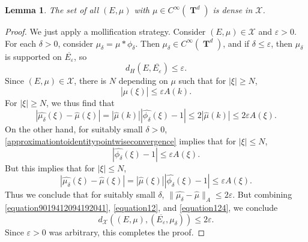 \documentclass[12pt,reqno]{article}
\DeclareMathOperator{\TT}{\mathbf{T}}
\newtheorem{lemma}[theorem]{Lemma}
\begin{document}
\begin{lemma}
    The set of all $(E,\mu)$ with $\mu \in C^\infty(\TT^d)$ is dense in $\mathcal{X}$.
\end{lemma}
\begin{proof}
    We just apply a mollification strategy. Consider $(E,\mu) \in \mathcal{X}$ and $\varepsilon > 0$. For each $\delta > 0$, consider $\mu_\delta = \mu * \phi_\delta$. Then $\mu_\delta \in C^\infty(\TT^d)$, and if $\delta \leq \varepsilon$, then $\mu_\delta$ is supported on $\overline{E_\varepsilon}$, so
    \begin{equation} \label{equation9019412094192041}
        d_H(E,\overline{E_\varepsilon}) \leq \varepsilon.
    \end{equation}
    Since $(E,\mu) \in \mathcal{X}$, there is $N$ depending on $\mu$ such that for $|\xi| \geq N$,
    \[ |\widehat{\mu}(\xi)| \leq \varepsilon A(k). \]
    For $|\xi| \geq N$, we thus find that
    \begin{equation} \label{equation12}
        |\widehat{\mu_\delta}(\xi) - \widehat{\mu}(\xi)| = |\widehat{\mu}(k)||\widehat{\phi_\delta}(\xi) - 1| \leq 2 |\widehat{\mu}(k)| \leq 2\varepsilon A(\xi).
    \end{equation}
    On the other hand, for suitably small $\delta > 0$, \eqref{approximationtoidentitypointwiseconvergence} implies that for $|\xi| \leq N$,
    \[ |\widehat{\phi_\delta}(\xi) - 1| \leq \varepsilon A(\xi). \]
    But this implies that for $|\xi| \leq N$,
    \begin{equation} \label{equation124}
        |\widehat{\mu_\delta}(\xi) - \widehat{\mu}(\xi)| = |\widehat{\mu}(\xi)| |\widehat{\phi_\delta}(\xi) - 1| \leq \varepsilon A(\xi).
    \end{equation}
    Thus we conclude that for suitably small $\delta$, $\| \widehat{\mu_\delta} - \widehat{\mu} \|_A \leq 2 \varepsilon$. But combining \eqref{equation9019412094192041}, \eqref{equation12}, and \eqref{equation124}, we conclude
    \[ d_{\mathcal{X}}((E,\mu), (\overline{E_\varepsilon}, \mu_\delta)) \leq 2 \varepsilon. \]
    Since $\varepsilon > 0$ was arbitrary, this completes the proof.
\end{proof}
\end{document}
